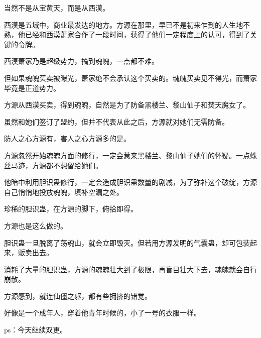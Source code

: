 \begin{this_body}
当然不是从宝黄天，而是从西漠。

西漠是五域中，商业最发达的地方。方源在那里，早已不是初来乍到的人生地不熟，他已经和西漠萧家合作了一段时间，获得了他们一定程度上的认可，得到了关键的令牌。

西漠萧家乃是超级势力，搞到魂魄，一点都不难。

但如果魂魄买卖被曝光，萧家绝不会承认这个买卖的。魂魄买卖见不得光，而萧家毕竟是正道势力。

方源从西漠买卖，得到魂魄，自然是为了防备黑楼兰、黎山仙子和焚天魔女了。

虽然和她们签订了盟约，但并不代表从此之后，方源就对她们无需防备。

防人之心方源有，害人之心方源多的是。

方源忽然开始魂魄方面的修行，一定会惹来黑楼兰、黎山仙子她们的怀疑。一点蛛丝马迹，方源都不想留给她们。

他暗中利用胆识蛊修行，一定会造成胆识蛊数量的剧减，为了弥补这个破绽，方源自己悄悄地投放魂魄，填补空漏之处。

珍稀的胆识蛊，在方源的脚下，俯拾即得。

方源也是这么做的。

胆识蛊一旦脱离了荡魂山，就会立即毁灭。但若用方源发明的气囊蛊，却可包装起来，贩卖出去。

消耗了大量的胆识蛊，方源的魂魄壮大到了极限，再盲目壮大下去，魂魄就会自行崩散。

方源感到，就连仙僵之躯，都有些拥挤的错觉。

好像是一个成年人，穿着他青年时候的，小了一号的衣服一样。

ps：今天继续双更。

\end{this_body}


